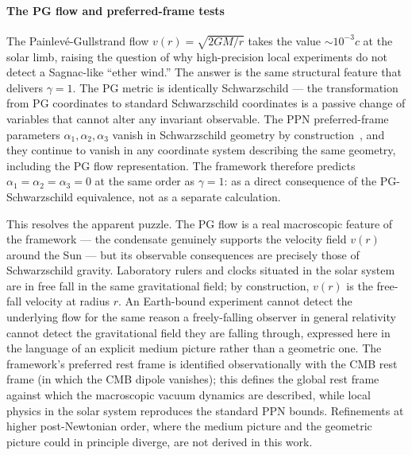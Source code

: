 \documentclass[12pt, a4paper]{article}
\begin{document}
\paragraph{The PG flow and preferred-frame tests}
The Painlev\'{e}-Gullstrand flow $v(r) = \sqrt{2GM/r}$ takes the value $\sim 10^{-3}c$ at the solar limb, raising the question of why high-precision local experiments do not detect a Sagnac-like ``ether wind.'' The answer is the same structural feature that delivers $\gamma = 1$. The PG metric is identically Schwarzschild --- the transformation from PG coordinates to standard Schwarzschild coordinates is a passive change of variables that cannot alter any invariant observable. The PPN preferred-frame parameters $\alpha_1, \alpha_2, \alpha_3$ vanish in Schwarzschild geometry by construction~\cite{will_2014}, and they continue to vanish in any coordinate system describing the same geometry, including the PG flow representation. The framework therefore predicts $\alpha_1 = \alpha_2 = \alpha_3 = 0$ at the same order as $\gamma = 1$: as a direct consequence of the PG-Schwarzschild equivalence, not as a separate calculation.

This resolves the apparent puzzle. The PG flow is a real macroscopic feature of the framework --- the condensate genuinely supports the velocity field $v(r)$ around the Sun --- but its observable consequences are precisely those of Schwarzschild gravity. Laboratory rulers and clocks situated in the solar system are in free fall in the same gravitational field; by construction, $v(r)$ is the free-fall velocity at radius $r$. An Earth-bound experiment cannot detect the underlying flow for the same reason a freely-falling observer in general relativity cannot detect the gravitational field they are falling through, expressed here in the language of an explicit medium picture rather than a geometric one. The framework's preferred rest frame is identified observationally with the CMB rest frame (in which the CMB dipole vanishes); this defines the global rest frame against which the macroscopic vacuum dynamics are described, while local physics in the solar system reproduces the standard PPN bounds. Refinements at higher post-Newtonian order, where the medium picture and the geometric picture could in principle diverge, are not derived in this work.
\end{document}
